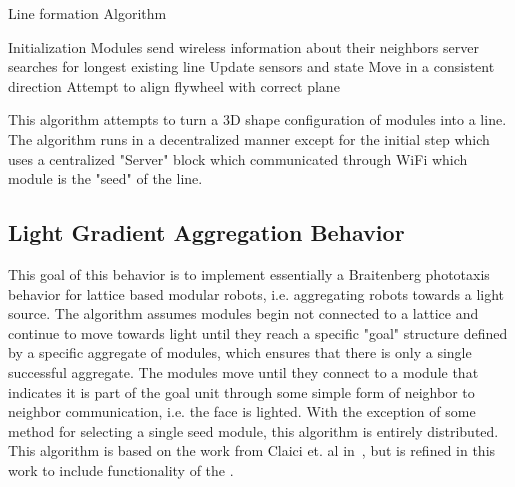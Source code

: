 \setcounter{algorithm}{0}
\begin{algorithm}[ht] 
	\caption{Line formation Algorithm}
	\label{algorithmLine}
	\SetAlgoLined
	Initialization\;
	{
		Modules send wireless information about their neighbors\;
		server searches for longest existing line\;
	}
	{
		Update sensors and state\;
		{
			Move in a consistent direction \;
		}
		{
			Attempt to align flywheel with correct plane\;
		}
	}
	\caption{This algorithm attempts to turn a 3D shape configuration of modules into a line. The algorithm runs in a decentralized manner except for the initial step which uses a centralized "Server" block which communicated through WiFi which module is the "seed" of the line. }
\end{algorithm}




\subsection{Light Gradient Aggregation Behavior}
\label{sec:algLight}
This goal of this behavior is to implement essentially a Braitenberg phototaxis behavior for lattice based modular robots, i.e. aggregating robots towards a light source. The algorithm assumes modules begin not connected to a lattice and continue to move towards light until they reach a specific "goal" structure defined by a specific aggregate of modules, which ensures that there is only a single successful aggregate. The modules move until they connect to a module that indicates it is part of the goal unit through some simple form of neighbor to neighbor communication, i.e. the face is lighted. With the exception of some method for selecting a single seed module, this algorithm is entirely distributed. This algorithm is based on the work from Claici et. al in~\cite{claici2017distributed}, but is refined in this work to include functionality of the \tagNamePlural.


